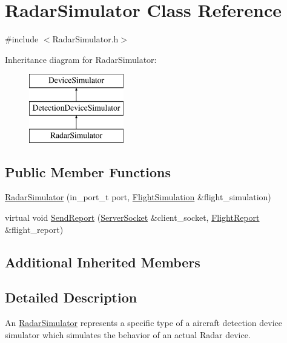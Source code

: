 \hypertarget{class_radar_simulator}{}\section{Radar\+Simulator Class Reference}
\label{class_radar_simulator}


{\ttfamily \#include $<$Radar\+Simulator.\+h$>$}

Inheritance diagram for Radar\+Simulator\+:\begin{figure}[H]
\begin{center}
\leavevmode
\includegraphics[height=3.000000cm]{class_radar_simulator}
\end{center}
\end{figure}
\subsection*{Public Member Functions}
\begin{DoxyCompactItemize}
\item 
\hyperlink{class_radar_simulator_a3d579c2428c77ecb57b7d57df14e1f7a}{Radar\+Simulator} (in\+\_\+port\+\_\+t port, \hyperlink{class_flight_simulation}{Flight\+Simulation} \&flight\+\_\+simulation)
\item 
virtual void \hyperlink{class_radar_simulator_ac4681a4e7f376c61cb058b1b0383c8c4}{Send\+Report} (\hyperlink{class_server_socket}{Server\+Socket} \&client\+\_\+socket, \hyperlink{class_flight_report}{Flight\+Report} \&flight\+\_\+report)
\end{DoxyCompactItemize}
\subsection*{Additional Inherited Members}


\subsection{Detailed Description}
An \hyperlink{class_radar_simulator}{Radar\+Simulator} represents a specific type of a aircraft detection device simulator which simulates the behavior of an actual Radar device. 

